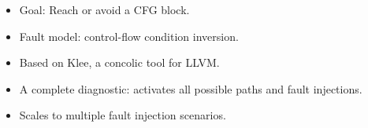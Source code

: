 \documentclass[final]{beamer}
\begin{document}
\begin{frame}[fragile]{}
\begin{tcolorbox}[adjusted title={\centering \Large Fault simulators}]
\begin{columns}[t]
\begin{column}{0.31\linewidth}
\begin{tcolorbox}
\begin{itemize}
\item Goal: Reach or avoid a CFG block.
	\vspace{3mm}
\item Fault model: control-flow condition inversion.
	\vspace{3mm}
\item Based on Klee, a concolic tool for LLVM.
	\vspace{3mm}
\item A complete diagnostic: activates all possible paths and fault injections.
	\vspace{3mm}
\item Scales to multiple fault injection scenarios.
\end{itemize}
    \end{tcolorbox}
    \end{column}
    \begin{column}{0.31\linewidth}
    \begin{tcolorbox}[
    colback=white, %
    colframe=normalTitleBlockColor, %
    colframe=gray!20, %
    coltext=black, %
    coltitle=black, %
    bottom=2mm,
    boxrule=1mm,
    equal height group=A,
    adjusted title={\large EFS \normalsize (by MORPHO)}]


\end{tcolorbox}
\end{column}
\end{columns}
\end{tcolorbox}
\end{frame}
\end{document}
